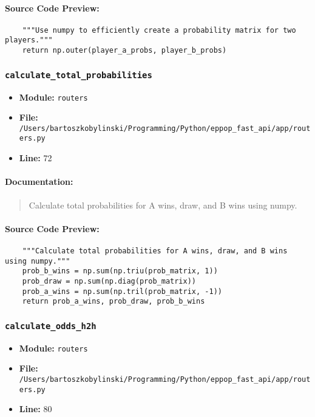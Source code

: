 \documentclass[11pt,a4paper]{article}
\begin{document}
\paragraph{Source Code Preview:}
\begin{verbatim}
    """Use numpy to efficiently create a probability matrix for two players."""
    return np.outer(player_a_probs, player_b_probs)
\end{verbatim}

\vspace{1em}
\subsubsection{\texttt{calculate\_total\_probabilities}}

\begin{itemize}
    \item \textbf{Module:} \texttt{routers}
    \item \textbf{File:} \texttt{/Users/bartoszkobylinski/Programming/Python/eppop\_fast\_api/app/routers.py}
    \item \textbf{Line:} 72
\end{itemize}

\paragraph{Documentation:}
\begin{quote}
Calculate total probabilities for A wins, draw, and B wins using numpy.
\end{quote}

\paragraph{Source Code Preview:}
\begin{verbatim}
    """Calculate total probabilities for A wins, draw, and B wins using numpy."""
    prob_b_wins = np.sum(np.triu(prob_matrix, 1))
    prob_draw = np.sum(np.diag(prob_matrix))
    prob_a_wins = np.sum(np.tril(prob_matrix, -1))
    return prob_a_wins, prob_draw, prob_b_wins
\end{verbatim}

\vspace{1em}
\subsubsection{\texttt{calculate\_odds\_h2h}}

\begin{itemize}
    \item \textbf{Module:} \texttt{routers}
    \item \textbf{File:} \texttt{/Users/bartoszkobylinski/Programming/Python/eppop\_fast\_api/app/routers.py}
    \item \textbf{Line:} 80
\end{itemize}
\end{document}
